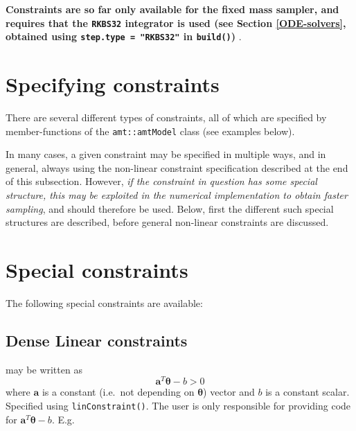 \documentclass[
]{book}
\begin{document}
\textbf{Constraints are so far only available for the fixed mass sampler, and requires that the \texttt{RKBS32} integrator is used (see Section \ref{ODE-solvers}, obtained using \texttt{step.type\ =\ "RKBS32"} in \texttt{build()}) }.

\hypertarget{specifying-constraints}{%
\section{Specifying constraints}\label{specifying-constraints}}

There are several different types of constraints, all of which are specified by member-functions
of the \texttt{amt::amtModel} class (see examples below).

In many cases, a given constraint may be specified in multiple ways, and in general, always using the non-linear constraint specification described at the end of this subsection. However, \emph{if the constraint in question has some special structure, this may be exploited in the numerical implementation to obtain faster sampling}, and should therefore be used. Below, first the different such special structures are described, before general non-linear constraints are discussed.

\hypertarget{special-constraints}{%
\section{Special constraints}\label{special-constraints}}

The following special constraints are available:

\hypertarget{dense-linear-constraints}{%
\subsection{Dense Linear constraints}\label{dense-linear-constraints}}

may be written as
\[
\mathbf a^T \boldsymbol \theta - b>0
\]
where \(\mathbf a\) is a constant (i.e.~not depending on \(\boldsymbol \theta\)) vector and \(b\) is a constant scalar. Specified using \texttt{linConstraint()}. The user is only responsible for providing code for \(\mathbf a^T \boldsymbol \theta - b\). E.g.
\end{document}
